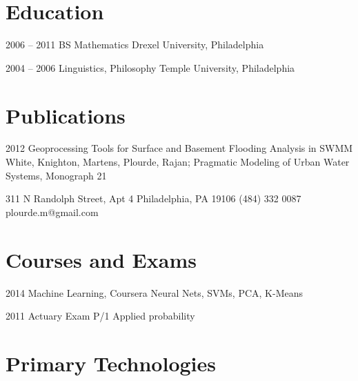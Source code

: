 \documentclass{tccv}
\begin{document}
\section{Education}

\begin{yearlist}

\item{2006 -- 2011}
     {BS Mathematics}
     {Drexel University, Philadelphia}

\item{2004 -- 2006}
     {Linguistics, Philosophy}
     {Temple University, Philadelphia}

\end{yearlist}





\section{Publications}

\begin{yearlist2}

\item{2012}
     {Geoprocessing Tools for Surface and Basement Flooding Analysis in SWMM}
     {White, Knighton, Martens, Plourde, \mbox{Rajan}; Pragmatic Modeling of Urban Water Systems, Monograph 21}


\end{yearlist2}


\personal
    {311 N Randolph Street, Apt 4 \newline Philadelphia, PA 19106}
    {(484) 332 0087}
    {plourde.m@gmail.com}
    

\section{Courses and Exams}

\begin{yearlist2}

\item{2014}
     {Machine Learning, Coursera}
     {Neural Nets, SVMs, PCA, K-Means}

\item{2011}
     {Actuary Exam P/1}
     {Applied probability}


\end{yearlist2}


\section{Primary Technologies}
\end{document}
